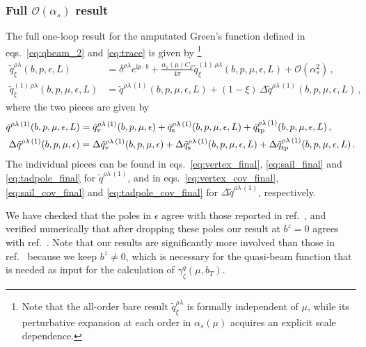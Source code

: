 \documentclass[11pt,a4paper]{article}
\DeclareRobustCommand{\eqs}[2]{eqs.~\eqref{eq:#1} and \eqref{eq:#2}}
\DeclareRobustCommand{\eqss}[3]{eqs.~\eqref{eq:#1}, \eqref{eq:#2} and \eqref{eq:#3}}
\DeclareRobustCommand{\mycite}[1]{ref.~\cite{#1}}
\newcommand{\img}{\mathrm{i}}
\newcommand{\eps}{\epsilon}
\newcommand{\cO}{\mathcal{O}}
\newcommand{\nn}{\nonumber}
\newcommand{\as}{\alpha_s}
\newcommand{\pb}{{p{\cdot}b}}
\begin{document}
\subsubsection[\texorpdfstring{Full $\cO(\as)$ result}{Full O(alphaS) result}]{\boldmath Full $\cO(\as)$ result}
\label{sec:full_nlo}

The full one-loop result for the amputated Green's function defined in \eqs{qbeam_2}{trace} is given by%
\footnote{Note that the all-order bare result $\tilde q_\xi^{\rho\lambda}$ is formally independent of $\mu$,
while its perturbative expansion at each order in $\alpha_s(\mu)$ acquires an explicit scale dependence.}
\begin{align}
 \tilde q^{\rho\lambda}_\xi(b,p,\eps,L) &=
 \delta^{\rho\lambda} e^{\img \pb} + \frac{\as(\mu) C_F}{4\pi} \tilde q^{(1)\, \rho\lambda}_\xi(b,p,\mu,\eps,L) + \cO(\as^2)
\,,\nn\\
 \tilde q^{(1)\,\rho\lambda}_\xi(b,p,\mu,\eps,L) &= \tilde q^{\rho\lambda\,(1)}(b,p,\mu,\eps,L) + (1-\xi) \, \Delta \tilde q^{\rho\lambda\,(1)}(b,p,\mu,\eps,L)
\,,\end{align}
where the two pieces are given by
\begin{align}
 \tilde q^{\rho\lambda\,(1)}(b,p,\mu,\eps,L) &=
   \tilde q^{\rho\lambda\,(1)}_{\rm v}(b,p,\mu,\eps)
 + \tilde q^{\rho\lambda\,(1)}_{\rm s}(b,p,\mu,\eps,L)
 + \tilde q^{\rho\lambda\,(1)}_{\rm tp}(b,p,\mu,\eps,L)
\,,\\\nn
 \Delta\tilde q^{\rho\lambda\,(1)}(b,p,\mu,\eps) &=
   \Delta\tilde q^{\rho\lambda\,(1)}_{\rm v}(b,p,\mu,\eps)
 + \Delta\tilde q^{\rho\lambda\,(1)}_{\rm s}(b,p,\mu,\eps,L)
 + \Delta\tilde q^{\rho\lambda\,(1)}_{\rm tp}(b,p,\mu,\eps,L)
\,.\end{align}
The individual pieces can be found in \eqss{vertex_final}{sail_final}{tadpole_final} for $\tilde q^{\rho\lambda\,(1)}$,
and in \eqss{vertex_cov_final}{sail_cov_final}{tadpole_cov_final} for $\Delta\tilde q^{\rho\lambda\,(1)}$, respectively.

We have checked that the poles in $\eps$ agree with those reported in \mycite{Ebert:2019okf,Constantinou:2019vyb},
and verified numerically that after dropping these poles our result at $b^z=0$ agrees with \mycite{Constantinou:2019vyb}.
Note that our results are significantly more involved than those in \mycite{Constantinou:2019vyb} because we keep $b^z \ne 0$, which is necessary for the quasi-beam function that is needed as input for the calculation of $\gamma_\zeta^q(\mu,b_T)$.
\end{document}
